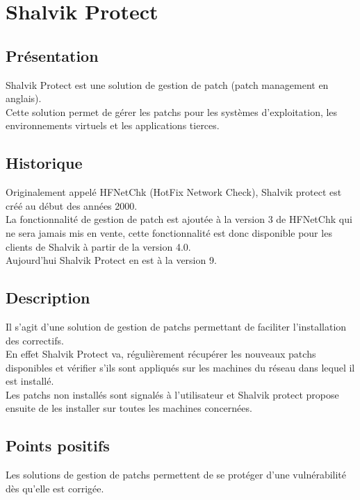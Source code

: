 \section{Shalvik Protect}
\thispagestyle{plain}
\subsection{Présentation}
Shalvik Protect est une solution de gestion de patch (patch management en anglais).\\
Cette solution permet de gérer les patchs pour les systèmes d’exploitation, les environnements virtuels et les applications tierces.\\

\subsection{Historique}
Originalement appelé HFNetChk (HotFix Network Check), Shalvik protect est créé au début des années 2000.\\
La fonctionnalité de gestion de patch est ajoutée à la version 3 de HFNetChk qui ne sera jamais mis en vente, cette fonctionnalité est donc disponible pour les clients de Shalvik à partir de la version 4.0.\\
Aujourd’hui Shalvik Protect en est à la version 9.\\

\subsection{Description}
Il s'agit d'une solution de gestion de patchs permettant de faciliter l’installation des correctifs.\\

En effet Shalvik Protect va, régulièrement récupérer les nouveaux patchs disponibles et vérifier s'ils sont appliqués sur les machines du réseau dans lequel il est installé.\\

Les patchs  non installés sont signalés à l’utilisateur et Shalvik protect propose ensuite de les installer sur toutes les machines concernées.\\


\subsection{Points positifs}
Les solutions de gestion de patchs permettent de se protéger d’une vulnérabilité dès qu’elle est corrigée.\\

